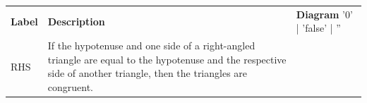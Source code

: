 \begin{table}[H]
    
        \begin{center}
      
      \label{m38380*id317997}
      
    \noindent
      \tablelasttail{}
     
\begin{xtabular*}{\mytablewidth}[t]{|p{10\mystarwidth}|p{10\mystarwidth}|p{
10\mystarwidth}|}\hline
    
    
        
                    \textbf{Label}
                   &
    
    
        
                    \textbf{Description}
                   &
    
    
        
                    \textbf{Diagram}
'0' | 'false' | ''
     \tabularnewline{}
    
    
        RHS &
    
    
        If the hypotenuse and one side of a right-angled triangle are equal to
the hypotenuse and the respective side of another triangle, then the triangles
are congruent. &
    

\end{xtabular*}
\end{center}
\end{table}
